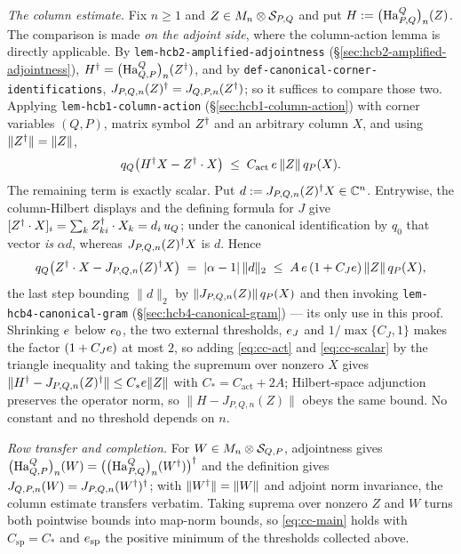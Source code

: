 \emph{The column estimate.} Fix $n\ge1$ and $Z\in M_{n}\otimes \mathcal S_{P,Q}$ and put
$H:=\bigl(\mathrm{Ha}^{Q}_{P,Q}\bigr)_{n}(Z)$. The comparison is made \emph{on the adjoint side}, where the
column-action lemma is directly applicable. By
\texttt{lem-hcb2-amplified-adjointness} (\S\ref{sec:hcb2-amplified-adjointness}),
$H^{\dagger}=\bigl(\mathrm{Ha}^{Q}_{Q,P}\bigr)_{n}(Z^{\dagger})$, and by \texttt{def-canonical-corner-identifications},
$J_{P,Q,n}(Z)^{\dagger}=J_{Q,P,n}(Z^{\dagger})$; so it suffices to compare those two. Applying
\texttt{lem-hcb1-column-action} (\S\ref{sec:hcb1-column-action}) with corner variables
$(Q,P)$, matrix symbol $Z^{\dagger}$ and an arbitrary column $X$, and using $\lVert Z^{\dagger}\rVert=\lVert Z\rVert$,
\begin{equation}\label{eq:cc-act}
  q_{Q}\bigl(H^{\dagger} X-Z^{\dagger}\mathbin{\cdot} X\bigr)\;\le\;C_{\mathrm{act}}\,e\,\lVert Z\rVert\,q_{P}(X).
\end{equation}
The remaining term is exactly scalar. Put $d:=J_{P,Q,n}(Z)^{\dagger} X\in\mathbb C^{n}$.
Entrywise, the column-Hilbert displays and the defining formula for $J$ give
$[Z^{\dagger}\mathbin{\cdot} X]_i=\sum_k Z_{ki}^{\dagger}\mathbin{\cdot} X_k=d_i\,u_{Q}$; under the canonical
identification by $q_0$ that vector \emph{is} $\alpha d$, whereas $J_{P,Q,n}(Z)^{\dagger} X$ is
$d$. Hence
\begin{equation}\label{eq:cc-scalar}
  q_{Q}\bigl(Z^{\dagger}\mathbin{\cdot} X-J_{P,Q,n}(Z)^{\dagger} X\bigr)
  \;=\;\lvert\alpha-1\rvert\,\lVert d\rVert_{2}
  \;\le\;A\,e\,(1+C_Je)\,\lVert Z\rVert\,q_{P}(X),
\end{equation}
the last step bounding $\lVert d\rVert_2$ by $\lVert J_{P,Q,n}(Z)\rVert\,q_{P}(X)$ and
then invoking \texttt{lem-hcb4-canonical-gram} (\S\ref{sec:hcb4-canonical-gram}) --- its
only use in this proof. Shrinking $e$ below $e_0$, the two external thresholds,
$e_J$ and $1/\max\{C_J,1\}$ makes the factor $(1+C_Je)$ at most $2$, so adding
\eqref{eq:cc-act} and \eqref{eq:cc-scalar} by the triangle inequality and taking the
supremum over nonzero $X$ gives
$\lVert H^{\dagger}-J_{P,Q,n}(Z)^{\dagger}\rVert\le C_{*}e\lVert Z\rVert$ with
$C_{*}=C_{\mathrm{act}}+2A$; Hilbert-space adjunction preserves the operator norm, so
$\lVert H-J_{P,Q,n}(Z)\rVert$ obeys the same bound. No constant and no threshold depends
on $n$.

\emph{Row transfer and completion.} For $W\in M_{n}\otimes \mathcal S_{Q,P}$, adjointness gives
$\bigl(\mathrm{Ha}^{Q}_{Q,P}\bigr)_{n}(W)=\bigl(\bigl(\mathrm{Ha}^{Q}_{P,Q}\bigr)_{n}(W^{\dagger})\bigr)^{\dagger}$ and the definition gives
$J_{Q,P,n}(W)=J_{P,Q,n}(W^{\dagger})^{\dagger}$; with $\lVert W^{\dagger}\rVert=\lVert W\rVert$ and adjoint norm invariance,
the column estimate transfers verbatim. Taking suprema over nonzero $Z$ and $W$ turns both
pointwise bounds into map-norm bounds, so \eqref{eq:cc-main} holds with
$C_{\mathrm{sp}}=C_{*}$ and $e_{\mathrm{sp}}$ the positive minimum of the thresholds
collected above.

